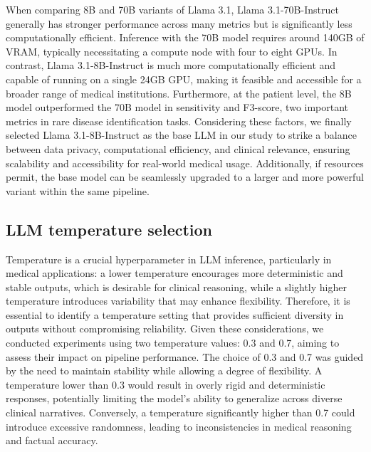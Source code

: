 \documentclass[fleqn,10pt]{wlscirep}
\begin{document}
When comparing 8B and 70B variants of Llama 3.1, Llama 3.1-70B-Instruct generally has stronger performance across many metrics but is significantly less computationally efficient. Inference with the 70B model requires around 140GB of VRAM, typically necessitating a compute node with four to eight GPUs. In contrast, Llama 3.1-8B-Instruct is much more computationally efficient and capable of running on a single 24GB GPU, making it feasible and accessible for a broader range of medical institutions. Furthermore, at the patient level, the 8B model outperformed the 70B model in sensitivity and F3-score, two important metrics in rare disease identification tasks. Considering these factors, we finally selected Llama 3.1-8B-Instruct as the base LLM in our study to strike a balance between data privacy, computational efficiency, and clinical relevance, ensuring scalability and accessibility for real-world medical usage. Additionally, if resources permit, the base model can be seamlessly upgraded to a larger and more powerful variant within the same pipeline.

\subsection*{LLM temperature selection}
Temperature is a crucial hyperparameter in LLM inference, particularly in medical applications: a lower temperature encourages more deterministic and stable outputs, which is desirable for clinical reasoning, while a slightly higher temperature introduces variability that may enhance flexibility. Therefore, it is essential to identify a temperature setting that provides sufficient diversity in outputs without compromising reliability. Given these considerations, we conducted experiments using two temperature values: 0.3 and 0.7, aiming to assess their impact on pipeline performance. The choice of 0.3 and 0.7 was guided by the need to maintain stability while allowing a degree of flexibility. A temperature lower than 0.3 would result in overly rigid and deterministic responses, potentially limiting the model’s ability to generalize across diverse clinical narratives. Conversely, a temperature significantly higher than 0.7 could introduce excessive randomness, leading to inconsistencies in medical reasoning and factual accuracy. 
\end{document}
